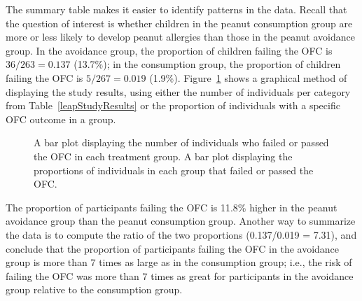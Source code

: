 The summary table makes it easier to identify patterns in the data. Recall that the question of interest is whether children in the peanut consumption group are more or less likely to develop peanut allergies than those in the peanut avoidance group. In the avoidance group, the proportion of children failing the OFC is $36/263 = 0.137$ (13.7\%); in the consumption group, the proportion of children failing the OFC is $5/267 = 0.019$ (1.9\%).  Figure~\ref{leapBarPlots} shows a graphical method of displaying the study results, using either the number of individuals per category from Table~\ref{leapStudyResults} or the proportion of individuals with a specific OFC outcome in a group. 

\begin{figure}[h!]
	\centering
	\caption{ A bar plot displaying the number of individuals who failed or passed the OFC in each treatment group.  A bar plot displaying the proportions of individuals in each group that failed or passed the OFC.}
	\label{leapBarPlots}
\end{figure}

The proportion of participants failing the OFC is 11.8\% higher in the peanut avoidance group than the peanut consumption group. Another way to summarize the data is to compute the ratio of the two proportions (0.137/0.019 = 7.31), and conclude that the proportion of participants failing the OFC in the avoidance group is more than 7 times as large as in the consumption group; i.e., the risk of failing the OFC was more than 7 times as great for participants in the avoidance group relative to the consumption group.

